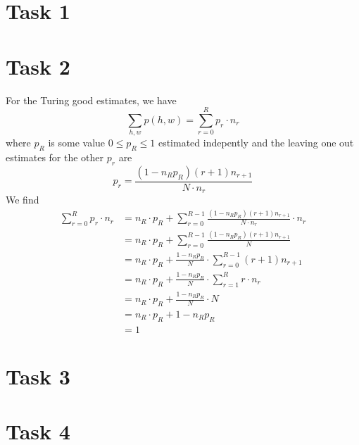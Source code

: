 \documentclass[%
   11pt,              %
   ngerman,           %
   a4paper,           %
   DIV11,             %
]{scrartcl}%
\begin{document}
\section*{Task 1}
\section*{Task 2}
For the Turing good estimates, we have
\begin{equation*}
	\sum_{h,w}p(h,w) = \sum_{r=0}^R p_r\cdot n_r
\end{equation*}
where $p_R$ is some value $0\leq p_R \leq 1$ estimated indepently and the leaving one out estimates for the other $p_r$ are
\begin{equation*}
	p_r = \frac{(1-n_R p_R) (r+1)n_{r+1}}{N\cdot n_r}
\end{equation*}
We find
\begin{align*}
	\sum_{r=0}^R p_r\cdot n_r &= n_R\cdot p_R + \sum_{r=0}^{R-1} \frac{(1-n_R p_R) (r+1)n_{r+1}}{N\cdot n_r} \cdot n_r \\
	&= n_R\cdot p_R + \sum_{r=0}^{R-1} \frac{(1-n_R p_R) (r+1)n_{r+1}}{N} \\
	&= n_R\cdot p_R + \frac{1-n_R p_R}{N} \cdot \sum_{r=0}^{R-1} (r+1)n_{r+1} \\
	&= n_R\cdot p_R + \frac{1-n_R p_R}{N} \cdot \sum_{r=1}^{R} r\cdot n_r \\
	&= n_R\cdot p_R + \frac{1-n_R p_R}{N} \cdot N \\
	&= n_R\cdot p_R + 1-n_R p_R\\
	&= 1
\end{align*}
\section*{Task 3}
\section*{Task 4}
\end{document}
